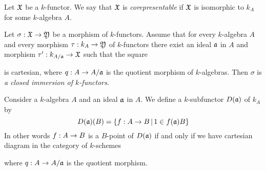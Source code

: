 \begin{definition}
Let ${\mathfrak X}$ be a $k$-functor. We say that ${\mathfrak X}$ is \textit{corepresentable} if ${\mathfrak X}$ is isomorphic to $k_A$ for some $k$-algebra $A$. 
\end{definition}

\begin{definition}
Let $\sigma:{\mathfrak X}\rightarrow {\mathfrak Y}$ be a morphism of $k$-functors. Assume that for every $k$-algebra $A$ and every morphism $\tau:k_A\rightarrow {\mathfrak Y}$ of $k$-functors there exist an ideal $\mathfrak{a}$ in $A$ and morphism $\tau':k_{A/\mathfrak{a}}\rightarrow {\mathfrak X}$ such that the square
\begin{center}
\end{center}
is cartesian, where $q:A\rightarrow A/\mathfrak{a}$ is the quotient morphism of $k$-algebras. Then $\sigma$ is \textit{a closed immersion of $k$-functors}.
\end{definition}
\noindent
Consider a $k$-algebra $A$ and an ideal $\mathfrak{a}$ in $A$. We define a $k$-subfunctor $D(\mathfrak{a})$ of $k_A$ by 
$$D(\mathfrak{a})(B) = \{f:A\rightarrow B\,|\,1 \in f(\mathfrak{a})B\}$$
In other words $f:A\rightarrow B$ is a $B$-point of $D(\mathfrak{a})$ if and only if we have cartesian diagram in the category of $k$-schemes
\begin{center}
\end{center}
where $q:A\rightarrow A/\mathfrak{a}$ is the quotient morphism.

